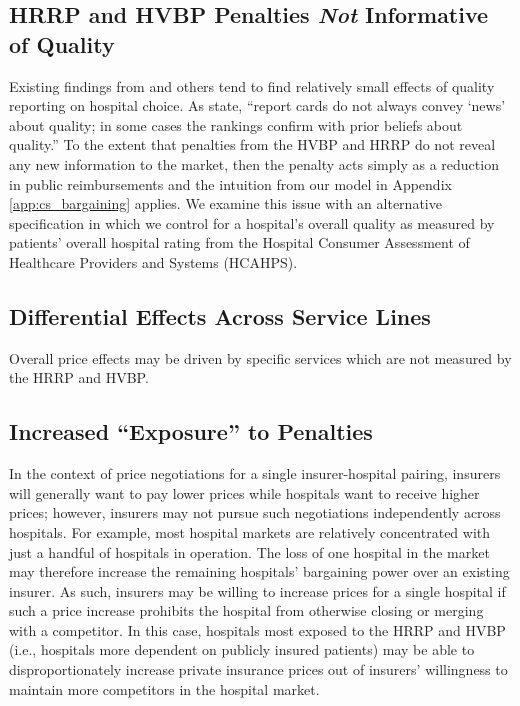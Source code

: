 \documentclass[12pt]{article}
\begin{document}
\subsection{HRRP and HVBP Penalties \textit{Not} Informative of Quality}
Existing findings from \cite{dranove2008} and others tend to find relatively small effects of quality reporting on hospital choice. As \cite{dranove2008} state, ``report cards do not always convey `news' about quality; in some cases the rankings confirm with prior beliefs about quality.'' To the extent that penalties from the HVBP and HRRP do not reveal any new information to the market, then the penalty acts simply as a reduction in public reimbursements and the intuition from our model in Appendix \ref{app:cs_bargaining} applies. We examine this issue with an alternative specification in which we control for a hospital's overall quality as measured by patients' overall hospital rating from the Hospital Consumer Assessment of Healthcare Providers and Systems (HCAHPS).


\subsection{Differential Effects Across Service Lines}
Overall price effects may be driven by specific services which are not measured by the HRRP and HVBP.


\subsection{Increased ``Exposure'' to Penalties}
In the context of price negotiations for a single insurer-hospital pairing, insurers will generally want to pay lower prices while hospitals want to receive higher prices; however, insurers may not pursue such negotiations independently across hospitals. For example, most hospital markets are relatively concentrated with just a handful of hospitals in operation. The loss of one hospital in the market may therefore increase the remaining hospitals' bargaining power over an existing insurer. As such, insurers may be willing to increase prices for a single hospital if such a price increase prohibits the hospital from otherwise closing or merging with a competitor. In this case, hospitals most exposed to the HRRP and HVBP (i.e., hospitals more dependent on publicly insured patients) may be able to disproportionately increase private insurance prices out of insurers' willingness to maintain more competitors in the hospital market.
\end{document}
